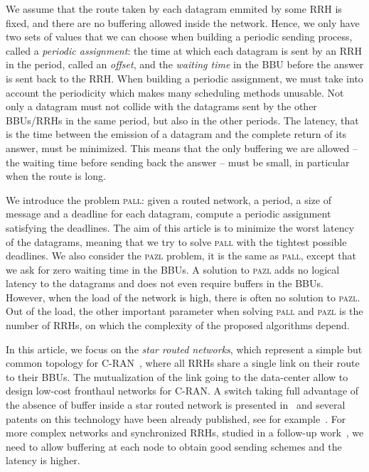 \documentclass[a4paper,10pt]{journal}
\newcommand\pazl{\textsc{pazl}\xspace}
\newcommand\pall{\textsc{pall}\xspace}
\begin{document}
We assume that the route taken by each datagram emmited by some RRH is fixed, and there are no buffering allowed inside the network. Hence, we only have two sets of values that we can choose when building a periodic sending process, called a \emph{periodic assignment}: the time at which each datagram is sent by an RRH in the period, called an \emph{offset}, and the \emph{waiting time} in the BBU before the answer is sent back to the RRH. 
When building a periodic assignment, we must take into account the periodicity which makes many scheduling methods unusable. Not only a datagram must not collide with the datagrams sent by the other BBUs/RRHs in the same period, but also in the other periods. The latency, that is the time between the emission of a datagram and the complete return of its answer, must be minimized. This means that the only buffering we are allowed -- the waiting time before sending back the answer -- must be small, in particular when the route is long.

We introduce the problem \pall: given a routed network, a period, a size of message and a deadline for each datagram, compute a periodic assignment
satisfying the deadlines. The aim of this article is to minimize the worst latency of the datagrams, meaning that we try to solve \pall with the tightest possible deadlines.
We also consider the \pazl problem, it is the same as \pall, except that we ask for zero waiting time in the BBUs. A solution to \pazl 
adds no logical latency to the datagrams and does not even require buffers in the BBUs. However, when the load of the network is high, there is often no solution
to \pazl. Out of the load, the other important parameter when solving \pall and \pazl is the number of RRHs, on which the complexity of the proposed algorithms depend. 

In this article, we focus on the \emph{star routed networks}, which represent a simple but common topology for C-RAN~\cite{electronics9122131,bhattacharjee2020time},
where all RRHs share a single link on their route to their BBUs. The mutualization of the link going to the data-center allow to design low-cost fronthaul networks for C-RAN.  
A switch taking full advantage of the absence of buffer inside a star routed network is presented in~\cite{Marc2201:Experimental} and several patents on this technology have been already published, see for example~\cite{howe2005time,leclerc2016transmission}. For more complex networks and synchronized RRHs, studied in a follow-up work~\cite{guiraud2021deterministic}, we need to allow buffering at each node to obtain good sending schemes and the latency is higher.
\end{document}
